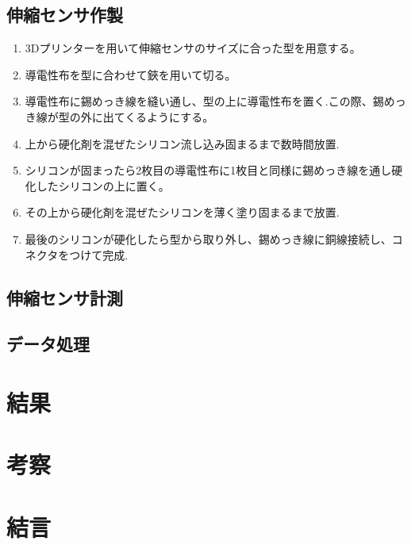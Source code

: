 \subsection{伸縮センサ作製}
\begin{enumerate}
    \item 3Dプリンターを用いて伸縮センサのサイズに合った型を用意する。
    \item 導電性布を型に合わせて鋏を用いて切る。
    \item 導電性布に錫めっき線を縫い通し、型の上に導電性布を置く.この際、錫めっき線が型の外に出てくるようにする。
    \item 上から硬化剤を混ぜたシリコン流し込み固まるまで数時間放置.
    \item シリコンが固まったら2枚目の導電性布に1枚目と同様に錫めっき線を通し硬化したシリコンの上に置く。
    \item その上から硬化剤を混ぜたシリコンを薄く塗り固まるまで放置.
    \item 最後のシリコンが硬化したら型から取り外し、錫めっき線に銅線接続し、コネクタをつけて完成.
\end{enumerate}
\subsection{伸縮センサ計測}

\subsection{データ処理}

\section{結果}

\section{考察}

\section{結言}

